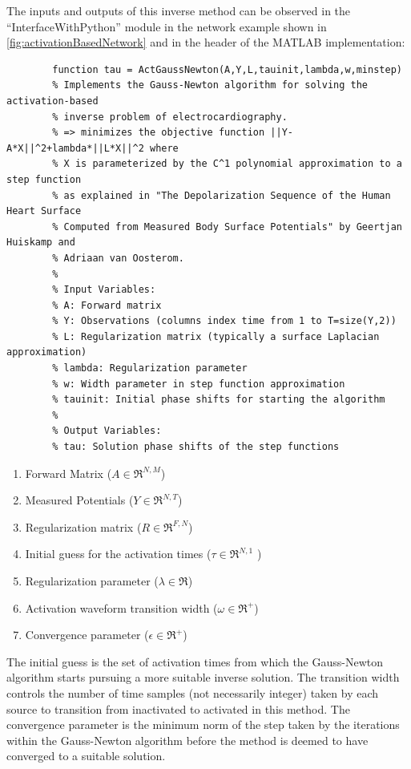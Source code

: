     The inputs and outputs of this inverse method can be observed in the ``InterfaceWithPython'' module in the network example shown in \autoref{fig:activationBasedNetwork} and in the header of the MATLAB implementation:
    \begin{verbatim}
        function tau = ActGaussNewton(A,Y,L,tauinit,lambda,w,minstep)
        % Implements the Gauss-Newton algorithm for solving the activation-based
        % inverse problem of electrocardiography.
        % => minimizes the objective function ||Y-A*X||^2+lambda*||L*X||^2 where
        % X is parameterized by the C^1 polynomial approximation to a step function
        % as explained in "The Depolarization Sequence of the Human Heart Surface
        % Computed from Measured Body Surface Potentials" by Geertjan Huiskamp and
        % Adriaan van Oosterom.
        %
        % Input Variables:
        % A: Forward matrix
        % Y: Observations (columns index time from 1 to T=size(Y,2))
        % L: Regularization matrix (typically a surface Laplacian approximation)
        % lambda: Regularization parameter
        % w: Width parameter in step function approximation
        % tauinit: Initial phase shifts for starting the algorithm
        %
        % Output Variables:
        % tau: Solution phase shifts of the step functions
    \end{verbatim}
    
    \begin{enumerate}
        \item Forward Matrix ($A\in\Re^{N,M}$)
        \item Measured Potentials ($Y\in\Re^{N,T}$)
        \item Regularization matrix ($R\in\Re^{F,N}$)
        \item Initial guess for the activation times ($\tau\in\Re^{N,1}$ )
        \item Regularization parameter ($\lambda\in\Re$)
        \item Activation waveform transition width ($\omega\in\Re^{+}$)
        \item Convergence parameter ($\epsilon\in\Re^{+}$)
    \end{enumerate}
    The initial guess is the set of activation times from which the Gauss-Newton algorithm starts pursuing a more suitable inverse solution. 
    The transition width controls the number of time samples (not necessarily integer) taken by each source to transition from inactivated to activated in this method. 
    The convergence parameter is the minimum norm of the step taken by the iterations within the Gauss-Newton algorithm before the method is deemed to have converged to a suitable solution. 
    
